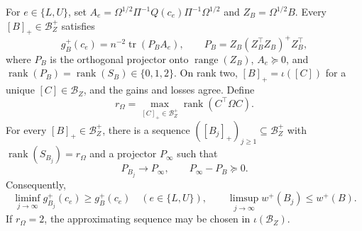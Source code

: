 For \(e\in\{L,U\}\), set \(A_e=\Omega^{1/2}\Pi^{-1}Q(c_e)\Pi^{-1}\Omega^{1/2}\) and \(Z_B=\Omega^{1/2}B\).  Every \([B]_+\in\mathcal B_Z^+\) satisfies
\[
 g_B^+(c_e)=n^{-2}\operatorname{tr}(P_BA_e),
 \qquad P_B=Z_B(Z_B^{\top}Z_B)^+Z_B^{\top},
\]
where \(P_B\) is the orthogonal projector onto \(\operatorname{range}(Z_B)\), \(A_e\succeq0\), and \(\operatorname{rank}(P_B)=\operatorname{rank}(S_B)\in\{0,1,2\}\).  On rank two, \([B]_+=\iota([C])\) for a unique \([C]\in\mathcal B_Z\), and the gains and losses agree.  Define
\[
r_\Omega=\max_{[C]_+\in\mathcal B_Z^+}\operatorname{rank}(C^{\top}\Omega C).
\]
For every \([B]_+\in\mathcal B_Z^+\), there is a sequence \(([B_j]_+)_{j\ge1}\subseteq\mathcal B_Z^+\) with \(\operatorname{rank}(S_{B_j})=r_\Omega\) and a projector \(P_\infty\) such that
\[
P_{B_j}\longrightarrow P_\infty,
\qquad P_\infty-P_B\succeq0.
\]
Consequently,
\[
\liminf_{j\to\infty}g_{B_j}^+(c_e)\ge g_B^+(c_e)
\quad(e\in\{L,U\}),
\qquad
\limsup_{j\to\infty}w^+(B_j)\le w^+(B).
\]
If \(r_\Omega=2\), the approximating sequence may be chosen in \(\iota(\mathcal B_Z)\).